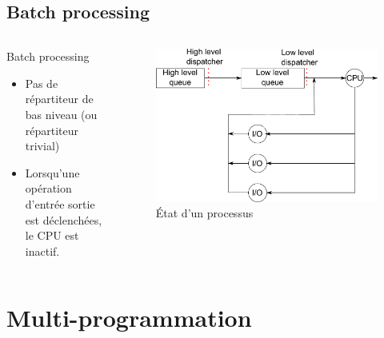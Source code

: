 \begin{frame}{\sectitle}
\def\subsectitle{Batch processing}
\subsection{\subsectitle}

\begin{columns}[c]

\begin{block}{\subsectitle}
\begin{itemize}
    \item Pas de répartiteur de bas niveau (ou répartiteur trivial)
    \item Lorsqu'une opération d'entrée sortie est déclenchées, le CPU est
    inactif.
\end{itemize}
\end{block}

\begin{figure}
\includegraphics[width=\textwidth]{images/batchDispatching.pdf}
\caption{État d'un processus}
\end{figure}

\end{columns}

\end{frame}

\def\sectitle{Multi-programmation}
\section{\sectitle}

